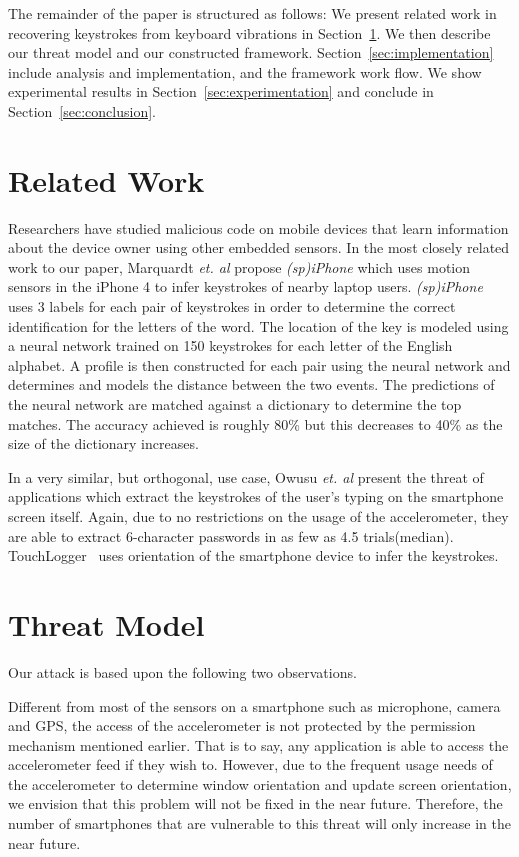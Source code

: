 \documentclass[11pt,conference]{IEEEtran}
\begin{document}
The remainder of the paper is structured as follows: 
We present related work in recovering keystrokes from keyboard vibrations in Section~\ref{sec:related}. We then describe our threat model and our constructed framework. Section~\ref{sec:implementation} include analysis and implementation, and the framework work flow. We show experimental results in Section~\ref{sec:experimentation} and conclude in Section~\ref{sec:conclusion}.

\section{Related Work}
\label{sec:related}
Researchers have studied malicious code on mobile devices that
learn information about the device owner using other embedded sensors.
In the most closely related work to our paper, Marquardt \emph{et. al}
\cite{spiphone} propose \emph{(sp)iPhone} which uses motion sensors in the
iPhone 4
to infer keystrokes of nearby laptop users. \emph{(sp)iPhone} uses 3 labels for
each pair of keystrokes in order to determine the correct identification for
the letters of the word. The location of the key is modeled using a neural
network trained on 150 keystrokes for each letter of the English alphabet.
A profile is then constructed for each pair using the neural network and
determines and models the distance between the two events. The predictions
of the neural network are matched against a dictionary to determine the top
matches. The accuracy achieved is roughly 80\% but this decreases to 40\%
as the size of the dictionary increases.

In a very similar, but orthogonal, use case, Owusu \emph{et. al}
\cite{owusu2012accessory}
present the threat of applications which extract the keystrokes of the
user's typing on the smartphone screen itself. Again, due to no restrictions
on the usage of the accelerometer, they are able to extract 6-character
passwords in as few as 4.5 trials(median). TouchLogger~\cite{cai2011touchlogger}
uses orientation of the smartphone device to infer the keystrokes.

\section{Threat Model}
\label{sec:threatmodel}
Our attack is based upon the following two observations.

Different from most of the sensors on a smartphone such as microphone, camera and GPS, the access of the accelerometer is not protected by the permission mechanism mentioned earlier. That is to say, any application is able to access the accelerometer feed if they wish to. However, due to the frequent usage needs of the accelerometer to determine window orientation and update screen orientation, we envision that this problem will not be fixed in the near future. Therefore, the number of smartphones that are vulnerable to this threat will only increase in the near future.
\end{document}
